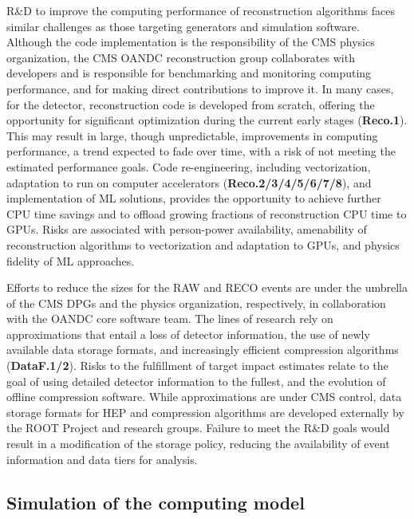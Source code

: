 R\&D to improve the computing performance of reconstruction algorithms faces similar challenges as those targeting generators and simulation software. Although the code implementation is the responsibility of the CMS physics organization, the CMS \gls{OANDC} reconstruction group collaborates with developers and is responsible for benchmarking and monitoring computing performance, and for making direct contributions to improve it. In many cases, for the \PhaseTwo detector, reconstruction code is developed from scratch, offering the opportunity for significant optimization during the current early stages (\textbf{Reco.1}). This may result in large, though unpredictable, improvements in computing performance, a trend expected to fade over time, with a risk of not meeting the estimated performance goals. Code re-engineering, including vectorization, adaptation to run on computer accelerators (\textbf{Reco.2/3/4/5/6/7/8}), and implementation of \gls{ML} solutions, provides the opportunity to achieve further \gls{CPU} time savings and to offload growing fractions of reconstruction \gls{CPU} time to \glspl{GPU}. Risks are associated with person-power availability, amenability of reconstruction algorithms to vectorization and adaptation to \glspl{GPU}, and physics fidelity of \gls{ML} approaches. 

Efforts to reduce the sizes for the \gls{RAW} and \gls{RECO} events are under the umbrella of the CMS \glspl{DPG} and the physics organization, respectively, in collaboration with the \gls{OANDC} core software team. The lines of research rely on approximations that entail a loss of detector information, the use of newly available data storage formats, and increasingly efficient compression algorithms (\textbf{DataF.1/2}). Risks to the fulfillment of target impact estimates relate to the goal of using detailed detector information to the fullest, and the evolution of offline compression software. While approximations are under CMS control, data storage formats for \gls{HEP} and compression algorithms are developed externally by the \textsc{ROOT} Project and research groups. Failure to meet the R\&D goals would result in a modification of the storage policy, reducing the availability of event information and data tiers for analysis. 

\subsection{Simulation of the computing model}
\label{compmod-simulation}

